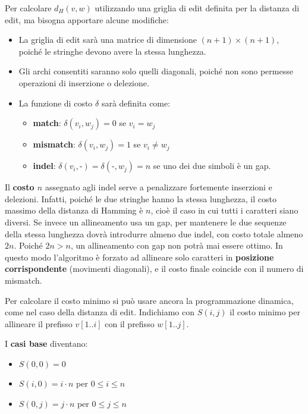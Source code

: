 Per calcolare $d_H(v, w)$ utilizzando una griglia di edit definita per la distanza 
di edit, ma bisogna apportare alcune modifiche:
\begin{itemize}
    \item La griglia di edit sarà una matrice di dimensione $(n+1) \times (n+1)$, poiché le stringhe devono avere la stessa lunghezza.
    \item Gli archi consentiti saranno solo quelli diagonali, poiché non sono permesse operazioni di inserzione o delezione. 
    \item La funzione di costo $\delta$ sarà definita come:
    \begin{itemize}
        \item \textbf{match}: $\delta(v_i, w_j) = 0$ se $v_i = w_j$ 
        \item \textbf{mismatch}: $\delta(v_i, w_j) = 1$ se $v_i \neq w_j$
        \item \textbf{indel}: $\delta(v_i, \text{-})=\delta(\text{-}, w_j)=n$ se uno dei due simboli è un gap.
    \end{itemize}
\end{itemize}

Il \textbf{costo $n$} assegnato agli indel serve a penalizzare fortemente inserzioni e
delezioni. Infatti, poiché le due stringhe hanno la stessa lunghezza, il costo
massimo della distanza di Hamming è $n$, cioè il caso in cui tutti i caratteri
siano diversi. Se invece un allineamento usa un gap, per mantenere le due
sequenze della stessa lunghezza dovrà introdurre almeno due indel, con costo
totale almeno $2n$. Poiché $2n > n$, un allineamento con gap non potrà mai essere
ottimo. In questo modo l'algoritmo è forzato ad allineare solo caratteri in
\textbf{posizione corrispondente} (movimenti diagonali), e il costo finale coincide con il numero di mismatch.

Per calcolare il costo minimo si può usare ancora la programmazione dinamica,
come nel caso della distanza di edit. Indichiamo con $S(i,j)$ il costo minimo
per allineare il prefisso $v[1..i]$ con il prefisso $w[1..j]$.

I \textbf{casi base} diventano:
\begin{itemize}
    \item $S(0,0)=0$
    \item $S(i,0)=i \cdot n$ per $0 \leq i \leq n$
    \item $S(0,j)=j \cdot n$ per $0 \leq j \leq n$
\end{itemize}

